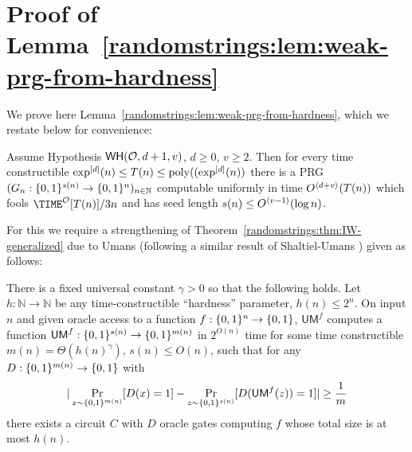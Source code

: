 \section{Proof of Lemma~\ref{randomstrings:lem:weak-prg-from-hardness}}
We prove here Lemma~\ref{randomstrings:lem:weak-prg-from-hardness}, which we restate below for convenience:


\begin{lemma*}
Assume Hypothesis $\mathsf{WH}(\mathcal{O},d+1,v)$, $d\geq 0$, $v \geq 2$. Then for every time constructible $\exp^{[d]}(n)  \leq T(n) \leq \mathrm{poly}((\exp^{[d]}(n))$ there is a PRG $(G_n: \{0,1\}^{s(n)} \to \{0,1\}^n)_{n \in \mathbb{N}}$ computable uniformly in time $O^{\langle d+v \rangle}(T(n))$ which fools $\TIME^{\mathcal{O}}[T(n)]/3n$ and has seed length $s(n) \leq O^{\langle v-1 \rangle}(\log n)$. 
\end{lemma*}

For this we require a strengthening of Theorem~\ref{randomstrings:thm:IW-generalized} due to Umans \cite{umans} (following a similar result of Shaltiel-Umans \cite{shaltiel-umans}) given as follows:

\begin{theorem}\label{randomstrings:thm:umans}
There is a fixed universal constant $\gamma > 0$ so that the following holds. Let $h: \mathbb{N} \to \mathbb{N}$ be any time-constructible ``hardness'' parameter, $h(n) \leq 2^n$. On input $n$ and given oracle access to a function $f: \{0,1\}^{n} \to \{0,1\}$, $\mathsf{UM}^f$ computes a function $\mathsf{UM}^f: \{0,1\}^{s(n)} \to \{0,1\}^{m(n)}$ in $2^{O(n)}$ time for some time constructible $m(n) =\Theta( h(n)^{\gamma})$, $s(n) \leq O(n)$, such that for any $D: \{0,1\}^{m(n)} \to \{0,1\}$ with
\[
|\Pr_{x \sim \{0,1\}^{m(n)}}[ D(x) = 1] - \Pr_{z \sim \{0,1\}^{s(n)}}[D(\mathsf{UM}^f(z)) = 1]| \geq \frac{1}{m}
\]
there exists a circuit $C$ with $D$ oracle gates computing $f$ whose total size is at most $h(n)$.
\end{theorem}


